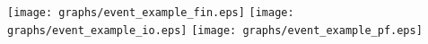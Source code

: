 \documentclass{article}
\begin{document}
\texttt{[image: graphs/event\_example\_fin.eps]} \pagebreak
\texttt{[image: graphs/event\_example\_io.eps]} \pagebreak
\texttt{[image: graphs/event\_example\_pf.eps]} \pagebreak
\end{document}

